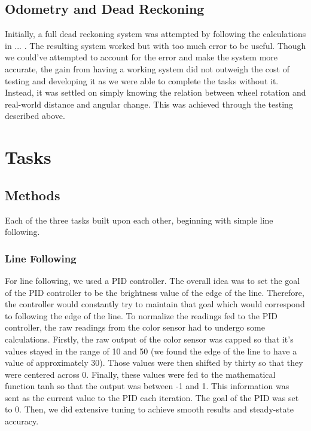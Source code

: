 \documentclass[12pt]{article}
\begin{document}
\subsection{Odometry and Dead Reckoning}

Initially, a full dead reckoning system was attempted by following the calculations in ... . The resulting system worked but with too much error to be useful. Though we could've attempted to account for the error and make the system more accurate, the gain from having a working system did not outweigh the cost of testing and developing it as we were able to complete the tasks without it. Instead, it was settled on simply knowing the relation between wheel rotation and real-world distance and angular change. This was achieved through the testing described above. 

\section{Tasks}

\subsection{Methods}

Each of the three tasks built upon each other, beginning with simple line following.

\subsubsection{Line Following}

For line following, we used a PID controller. The overall idea was to set the goal of the PID controller to be the brightness value of the edge of the line. Therefore, the controller would constantly try to maintain that goal which would correspond to following the edge of the line. To normalize the readings fed to the PID controller, the raw readings from the color sensor had to undergo some calculations. Firstly, the raw output of the color sensor was capped so that it's values stayed in the range of 10 and 50 (we found the edge of the line to have a value of approximately 30). Those values were then shifted by thirty so that they were centered across 0. Finally, these values were fed to the mathematical function tanh so that the output was between -1 and 1. This information was sent as the current value to the PID each iteration. The goal of the PID was set to 0. Then, we did extensive tuning to achieve smooth results and steady-state accuracy.
\end{document}
